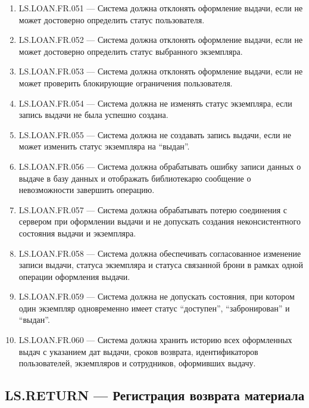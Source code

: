 \documentclass[12pt,a4paper]{article}
\begin{document}
\begin{enumerate}
		\item LS.LOAN.FR.051 --- Система должна отклонять оформление выдачи, если не
		может достоверно определить статус пользователя.
		
		\item LS.LOAN.FR.052 --- Система должна отклонять оформление выдачи, если не
		может достоверно определить статус выбранного экземпляра.
		
		\item LS.LOAN.FR.053 --- Система должна отклонять оформление выдачи, если не
		может проверить блокирующие ограничения пользователя.
		
		\item LS.LOAN.FR.054 --- Система должна не изменять статус экземпляра, если
		запись выдачи не была успешно создана.
		
		\item LS.LOAN.FR.055 --- Система должна не создавать запись выдачи, если не может
		изменить статус экземпляра на ``выдан''.
		
		\item LS.LOAN.FR.056 --- Система должна обрабатывать ошибку записи данных о
		выдаче в базу данных и отображать библиотекарю сообщение о невозможности
		завершить операцию.
		
		\item LS.LOAN.FR.057 --- Система должна обрабатывать потерю соединения с сервером
		при оформлении выдачи и не допускать создания неконсистентного состояния
		выдачи и экземпляра.
		
		\item LS.LOAN.FR.058 --- Система должна обеспечивать согласованное изменение
		записи выдачи, статуса экземпляра и статуса связанной брони в рамках одной
		операции оформления выдачи.
		
		\item LS.LOAN.FR.059 --- Система должна не допускать состояния, при котором один
		экземпляр одновременно имеет статус ``доступен'', ``забронирован'' и ``выдан''.
		
		\item LS.LOAN.FR.060 --- Система должна хранить историю всех оформленных выдач
		с указанием дат выдачи, сроков возврата, идентификаторов пользователей,
		экземпляров и сотрудников, оформивших выдачу.
	\end{enumerate}
	
	\subsection{LS.RETURN --- Регистрация возврата материала}
	
\end{document}
